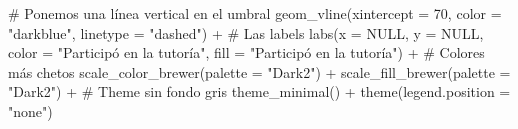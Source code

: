 \documentclass[
  letterpaper,
  DIV=11,
  numbers=noendperiod,
  oneside]{scrreprt}
\newenvironment{Shaded}{\begin{snugshade}}{\end{snugshade}}
\newcommand{\AttributeTok}[1]{\textcolor[rgb]{0.40,0.45,0.13}{#1}}
\newcommand{\CommentTok}[1]{\textcolor[rgb]{0.37,0.37,0.37}{#1}}
\newcommand{\ConstantTok}[1]{\textcolor[rgb]{0.56,0.35,0.01}{#1}}
\newcommand{\DecValTok}[1]{\textcolor[rgb]{0.68,0.00,0.00}{#1}}
\newcommand{\FunctionTok}[1]{\textcolor[rgb]{0.28,0.35,0.67}{#1}}
\newcommand{\NormalTok}[1]{\textcolor[rgb]{0.00,0.23,0.31}{#1}}
\newcommand{\SpecialCharTok}[1]{\textcolor[rgb]{0.37,0.37,0.37}{#1}}
\newcommand{\StringTok}[1]{\textcolor[rgb]{0.13,0.47,0.30}{#1}}
\begin{document}
\begin{Shaded}
\begin{Highlighting}[]
  \CommentTok{\# Ponemos una línea vertical en el umbral}
  \FunctionTok{geom\_vline}\NormalTok{(}\AttributeTok{xintercept =} \DecValTok{70}\NormalTok{, }\AttributeTok{color =} \StringTok{"darkblue"}\NormalTok{, }\AttributeTok{linetype =} \StringTok{"dashed"}\NormalTok{) }\SpecialCharTok{+} 
  \CommentTok{\# Las labels}
  \FunctionTok{labs}\NormalTok{(}\AttributeTok{x =} \ConstantTok{NULL}\NormalTok{, }
       \AttributeTok{y =} \ConstantTok{NULL}\NormalTok{,}
       \AttributeTok{color =} \StringTok{"Participó en la tutoría"}\NormalTok{,}
       \AttributeTok{fill =} \StringTok{"Participó en la tutoría"}\NormalTok{) }\SpecialCharTok{+} 
  \CommentTok{\# Colores más chetos}
  \FunctionTok{scale\_color\_brewer}\NormalTok{(}\AttributeTok{palette =} \StringTok{"Dark2"}\NormalTok{) }\SpecialCharTok{+}
  \FunctionTok{scale\_fill\_brewer}\NormalTok{(}\AttributeTok{palette =} \StringTok{"Dark2"}\NormalTok{) }\SpecialCharTok{+}
  \CommentTok{\# Theme sin fondo gris}
  \FunctionTok{theme\_minimal}\NormalTok{() }\SpecialCharTok{+}
  \FunctionTok{theme}\NormalTok{(}\AttributeTok{legend.position =} \StringTok{"none"}\NormalTok{)}



\end{Highlighting}
\end{Shaded}
\end{document}

